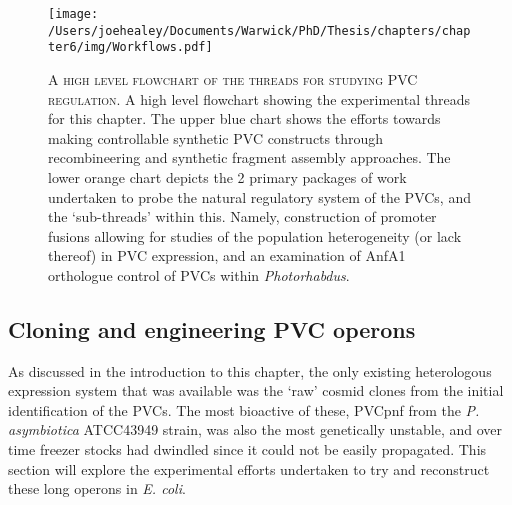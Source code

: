 \vspace{0.2cm}
\begin{figure}[h!]
\centering
    \texttt{[image: /Users/joehealey/Documents/Warwick/PhD/Thesis/chapters/chapter6/img/Workflows.pdf]}
\captionsetup{singlelinecheck=off, justification=justified, font=footnotesize, aboveskip=15pt}
\caption[Flowchart of work threads for PVC regulation studies]{\textsc{\normalsize A high level flowchart of the threads for studying PVC regulation.} \vspace{0.1cm} \newline A high level flowchart showing the experimental threads for this chapter. The upper blue chart shows the efforts towards making controllable synthetic PVC constructs through recombineering and synthetic fragment assembly approaches. The lower orange chart depicts the 2 primary packages of work undertaken to probe the natural regulatory system of the PVCs, and the `sub-threads' within this. Namely, construction of promoter fusions allowing for studies of the population heterogeneity (or lack thereof) in PVC expression, and an examination of AnfA1 orthologue control of PVCs within \emph{Photorhabdus}. }
\label{workflows}
\end{figure}




\subsection{Cloning and engineering PVC operons}\label{cloningPVCs}
As discussed in the introduction to this chapter, the only existing heterologous expression system that was available was the `raw' cosmid clones from the initial identification of the PVCs. The most bioactive of these, PVCpnf from the \emph{P. asymbiotica} ATCC43949 strain, was also the most genetically unstable, and over time freezer stocks had dwindled since it could not be easily propagated. This section will explore the experimental efforts undertaken to try and reconstruct these long operons in \emph{E. coli}.


